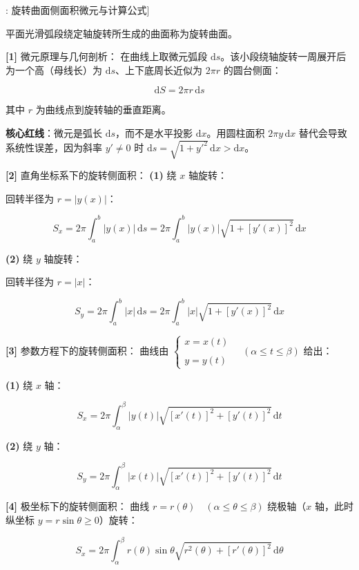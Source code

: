\documentclass[11pt,a4paper,UTF8]{ctexart}
\begin{document}
\begin{thmbox}[公式[7]: 旋转曲面侧面积微元与计算公式]

平面光滑弧段绕定轴旋转所生成的曲面称为旋转曲面。

\textbf{[1]} 微元原理与几何剖析：
在曲线上取微元弧段 $\mathrm{d}s$。该小段绕轴旋转一周展开后为一个高（母线长）为 $\mathrm{d}s$、上下底周长近似为 $2\pi r$ 的圆台侧面：


\begin{equation*}
\mathrm{d}S = 2\pi r\,\mathrm{d}s
\end{equation*}


其中 $r$ 为曲线点到旋转轴的垂直距离。

\textbf{核心红线}：微元是弧长 $\mathrm{d}s$，而不是水平投影 $\mathrm{d}x$。用圆柱面积 $2\pi y\,\mathrm{d}x$ 替代会导致系统性误差，因为斜率 $y' \neq 0$ 时 $\mathrm{d}s = \sqrt{1+y'^2}\,\mathrm{d}x > \mathrm{d}x$。

\textbf{[2]} 直角坐标系下的旋转侧面积：
\textbf{(1)}  \textit{}绕 $x$ 轴旋转\textit{}：

回转半径为 $r = |y(x)|$：


\begin{equation*}
S_x = 2\pi \int_a^b |y(x)|\,\mathrm{d}s = 2\pi \int_a^b |y(x)|\sqrt{1 + [y'(x)]^2}\,\mathrm{d}x
\end{equation*}


\textbf{(2)}  \textit{}绕 $y$ 轴旋转\textit{}：

回转半径为 $r = |x|$：


\begin{equation*}
S_y = 2\pi \int_a^b |x|\,\mathrm{d}s = 2\pi \int_a^b |x|\sqrt{1 + [y'(x)]^2}\,\mathrm{d}x
\end{equation*}


\textbf{[3]} 参数方程下的旋转侧面积：
曲线由 $\begin{cases} x = x(t) \\ \\ y = y(t) \end{cases} \quad (\alpha \leqslant t \leqslant \beta)$ 给出：

\textbf{(1)}  \textit{}绕 $x$ 轴\textit{}：


\begin{equation*}
S_x = 2\pi \int_\alpha^\beta |y(t)|\sqrt{[x'(t)]^2 + [y'(t)]^2}\,\mathrm{d}t
\end{equation*}


\textbf{(2)}  \textit{}绕 $y$ 轴\textit{}：


\begin{equation*}
S_y = 2\pi \int_\alpha^\beta |x(t)|\sqrt{[x'(t)]^2 + [y'(t)]^2}\,\mathrm{d}t
\end{equation*}


\textbf{[4]} 极坐标下的旋转侧面积：
曲线 $r = r(\theta) \quad (\alpha \leqslant \theta \leqslant \beta)$ 绕极轴（$x$ 轴，此时纵坐标 $y = r\sin\theta \geqslant 0$）旋转：


\begin{equation*}
S_x = 2\pi \int_\alpha^\beta r(\theta)\sin\theta \sqrt{r^2(\theta) + [r'(\theta)]^2}\,\mathrm{d}\theta
\end{equation*}


\end{thmbox}
\end{document}
